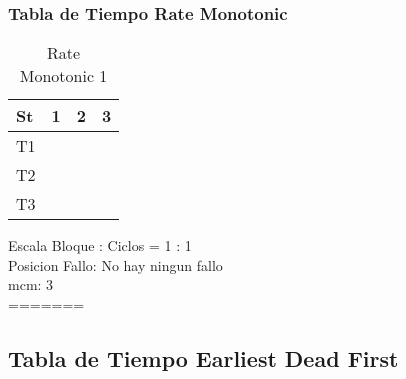 \documentclass[xcolor=table]{beamer}
\begin{document}
\begin{frame} 
\frametitle{Tabla de Tiempo  Rate Monotonic } 
\begin{table} 
\centering 
\begin{tabular}{|l|l|l|l|} 
\hline 
St &  1 \cellcolor{green} &  2 \cellcolor{green} &  3 \cellcolor{green} \\ \hline 
T1 & \cellcolor{blue} & & \\ \hline 
T2 & & \cellcolor{purple} & \\ \hline 
T3 & & & \cellcolor{cyan} \\ \hline 
\end{tabular} 
\caption{ Rate Monotonic 1 } 
\end{table} 
Escala Bloque : Ciclos = 1 : 1 \\ 
Posicion Fallo: No hay ningun fallo \\ 
mcm:  3 \\ 
=======
\subsection{Tabla de Tiempo  Earliest Dead First } 


\end{frame}
\end{document}
